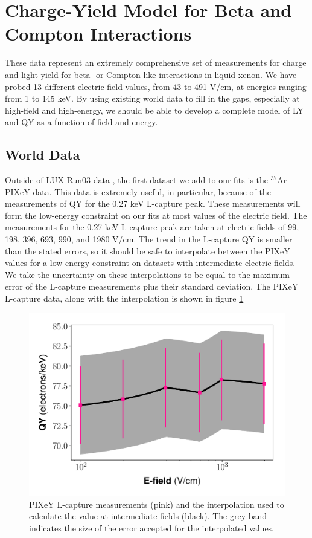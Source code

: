 \clearpage
\section{Charge-Yield Model for Beta and Compton Interactions}\label{sec:NESTbeta}
These data represent an extremely comprehensive set of measurements for charge and light yield for beta- or Compton-like interactions in liquid xenon. We have probed 13 different electric-field values, from 43 to 491 V/cm, at energies ranging from 1 to 145 keV. By using existing world data to fill in the gaps, especially at high-field and high-energy, we should be able to develop a complete model of LY and QY as a function of field and energy.

\subsection{World Data}
Outside of LUX Run03 data \cite{lux_tritium,Evanyields,DQyields}, the first dataset we add to our fits is the $^{37}$Ar PIXeY data\cite{pixey_ar37}. This data is extremely useful, in particular, because of the measurements of QY for the 0.27 keV L-capture peak. These measurements will form the low-energy constraint on our fits at most values of the electric field. The measurements for the 0.27 keV L-capture peak are taken at electric fields of 99, 198, 396, 693, 990, and 1980 V/cm. The trend in the L-capture QY is smaller than the stated errors, so it should be safe to interpolate between the PIXeY values for a low-energy constraint on datasets with intermediate electric fields. We take the uncertainty on these interpolations to be equal to the maximum error of the L-capture measurements plus their standard deviation. The PIXeY L-capture data, along with the interpolation is shown in figure \ref{fig:pixey_interp}
\begin{figure}[!h]
\centering
  \includegraphics[width=\textwidth]{Figures/Yields_fit_new/PIXeY_interp.pdf}
\caption{PIXeY L-capture measurements (pink) and the interpolation used to calculate the value at intermediate fields (black). The grey band indicates the size of the error accepted for the interpolated values.}
\label{fig:pixey_interp}
\end{figure}


